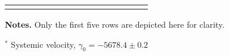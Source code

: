 \begin{table*}[t]
\begin{tabular}{ccccccccccccccc}
\hline\noalign{\smallskip}
\end{tabular}

\begin{list}{}{}
\item \textbf{Notes.} Only the first five rows are depicted here for clarity.
\item $^{*}$ Systemic velocity, $\gamma_0 = -5678.4\pm 0.2$ 
\end{list}

\end{table*}
